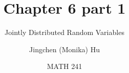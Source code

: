 \documentclass[slidestop,compress,mathserif]{beamer}
\title[Chapter 6 part 1]{Chapter 6 part 1}
\subtitle{Jointly Distributed Random Variables}
\author[Jingchen (Monika) Hu] %
{Jingchen (Monika) Hu}
\institute[Vassar] %
{Vassar College}
\date[MATH 241] %
{MATH 241}
\begin{document}
%



\begin{frame}%
\titlepage
\end{frame}


%
%
%
%
%
%
%
%
%
%
%
\end{document}
